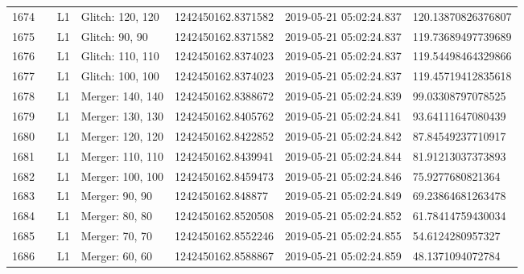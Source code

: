 \begin{longtable}{lllllll}
1674 &                                                    &       L1 &  Glitch: 120, 120 &  1242450162.8371582 &  2019-05-21 05:02:24.837 &  120.13870826376807 \\
1675 &                                                    &       L1 &    Glitch: 90, 90 &  1242450162.8371582 &  2019-05-21 05:02:24.837 &  119.73689497739689 \\
1676 &                                                    &       L1 &  Glitch: 110, 110 &  1242450162.8374023 &  2019-05-21 05:02:24.837 &  119.54498464329866 \\
1677 &                                                    &       L1 &  Glitch: 100, 100 &  1242450162.8374023 &  2019-05-21 05:02:24.837 &  119.45719412835618 \\
1678 &                                                    &       L1 &  Merger: 140, 140 &  1242450162.8388672 &  2019-05-21 05:02:24.839 &   99.03308797078525 \\
1679 &                                                    &       L1 &  Merger: 130, 130 &  1242450162.8405762 &  2019-05-21 05:02:24.841 &   93.64111647080439 \\
1680 &                                                    &       L1 &  Merger: 120, 120 &  1242450162.8422852 &  2019-05-21 05:02:24.842 &   87.84549237710917 \\
1681 &                                                    &       L1 &  Merger: 110, 110 &  1242450162.8439941 &  2019-05-21 05:02:24.844 &   81.91213037373893 \\
1682 &                                                    &       L1 &  Merger: 100, 100 &  1242450162.8459473 &  2019-05-21 05:02:24.846 &    75.9277680821364 \\
1683 &                                                    &       L1 &    Merger: 90, 90 &   1242450162.848877 &  2019-05-21 05:02:24.849 &   69.23864681263478 \\
1684 &                                                    &       L1 &    Merger: 80, 80 &  1242450162.8520508 &  2019-05-21 05:02:24.852 &   61.78414759430034 \\
1685 &                                                    &       L1 &    Merger: 70, 70 &  1242450162.8552246 &  2019-05-21 05:02:24.855 &    54.6124280957327 \\
1686 &                                                    &       L1 &    Merger: 60, 60 &  1242450162.8588867 &  2019-05-21 05:02:24.859 &    48.1371094072784 \\

\end{longtable}
